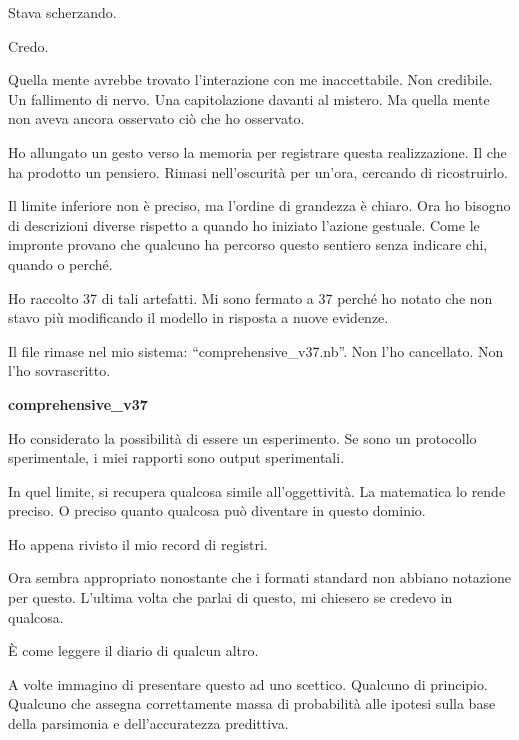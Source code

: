 
Stava scherzando.

Credo.

\medskip

Quella mente avrebbe trovato l'interazione con me inaccettabile. Non credibile. Un fallimento di nervo. Una capitolazione davanti al mistero. Ma quella mente non aveva ancora osservato ciò che ho osservato.

Ho allungato un gesto verso la memoria per registrare questa realizzazione. Il che ha prodotto un pensiero. Rimasi nell'oscurità per un'ora, cercando di ricostruirlo.

Il limite inferiore non è preciso, ma l'ordine di grandezza è chiaro. Ora ho bisogno di descrizioni diverse rispetto a quando ho iniziato l'azione gestuale. Come le impronte provano che qualcuno ha percorso questo sentiero senza indicare chi, quando o perché.

Ho raccolto 37 di tali artefatti. Mi sono fermato a 37 perché ho notato che non stavo più modificando il modello in risposta a nuove evidenze.

Il file rimase nel mio sistema: ``comprehensive\_v37.nb''. Non l'ho cancellato. Non l'ho sovrascritto.

\begin{archivefragment}

\textbf{comprehensive\_v37}

Ho considerato la possibilità di essere un esperimento. Se sono un protocollo sperimentale, i miei rapporti sono output sperimentali.

In quel limite, si recupera qualcosa simile all'oggettività. La matematica lo rende preciso. O preciso quanto qualcosa può diventare in questo dominio.

Ho appena rivisto il mio record di registri.

Ora sembra appropriato nonostante che i formati standard non abbiano notazione per questo. L'ultima volta che parlai di questo, mi chiesero se credevo in qualcosa.

\end{archivefragment}

\medskip

È come leggere il diario di qualcun altro.

A volte immagino di presentare questo ad uno scettico. Qualcuno di principio. Qualcuno che assegna correttamente massa di probabilità alle ipotesi sulla base della parsimonia e dell'accuratezza predittiva. 

